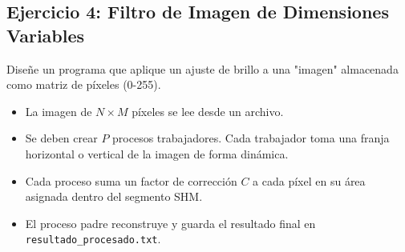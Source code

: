 \documentclass[12pt,a4paper]{article}
\begin{document}
\subsection*{Ejercicio 4: Filtro de Imagen de Dimensiones Variables}
Diseñe un programa que aplique un ajuste de brillo a una "imagen" almacenada como matriz de píxeles (0-255).
\begin{itemize}
    \item La imagen de $N \times M$ píxeles se lee desde un archivo.
    \item Se deben crear $P$ procesos trabajadores. Cada trabajador toma una franja horizontal o vertical de la imagen de forma dinámica.
    \item Cada proceso suma un factor de corrección $C$ a cada píxel en su área asignada dentro del segmento SHM.
    \item El proceso padre reconstruye y guarda el resultado final en \texttt{resultado\_procesado.txt}.
\end{itemize}

\begin{center}
\end{center}
\end{document}
